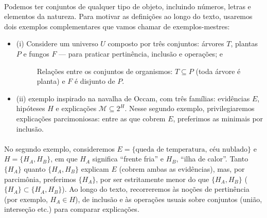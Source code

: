 \documentclass[12pt,a4paper]{article}
\begin{document}
\paragraph{}
Podemos ter conjuntos de qualquer tipo de objeto, incluindo números, letras e elementos da natureza. Para motivar as definições ao longo do texto, usaremos dois exemplos complementares que vamos chamar de exemplos-mestres:
\begin{itemize}
    \item (i) Considere um universo \(U\) composto por três conjuntos: árvores \(T\), plantas \(P\) e fungos \(F\) — para praticar pertinência, inclusão e operações; e

          \begin{figure}[H]
              \centering
              \caption{Relações entre os conjuntos de organismos: $T\subseteq P$ (toda árvore é planta) e $F$ é disjunto de $P$.}
              \label{fig:organismos}
          \end{figure}

    \item (ii) exemplo inspirado na navalha de Occam, com três famílias: evidências \(E\), hipóteses \(H\) e explicações \(\mathcal{M} \subseteq 2^{H}\). Nesse segundo exemplo, privilegiaremos explicações parcimoniosas: entre as que cobrem \(E\), preferimos as minimais por inclusão.
\end{itemize}

\paragraph{}
No segundo exemplo, consideremos \(E=\{\text{queda de temperatura},\, \text{céu nublado}\}\) e \(H=\{H_A, H_B\}\), em que \(H_A\) significa “frente fria” e \(H_B\), “ilha de calor”. Tanto \(\{H_A\}\) quanto \(\{H_A,H_B\}\) explicam \(E\) (cobrem ambas as evidências), mas, por parcimônia, preferimos \(\{H_A\}\), por ser estritamente menor do que \(\{H_A,H_B\}\) (\(\{H_A\} \subset \{H_A,H_B\}\)). Ao longo do texto, recorreremos às noções de pertinência (por exemplo, \(H_A\in H\)), de inclusão e às operações usuais sobre conjuntos (união, interseção etc.) para comparar explicações.
\end{document}
